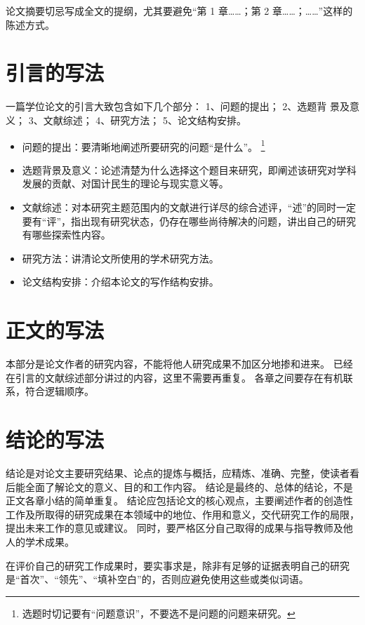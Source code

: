 论文摘要切忌写成全文的提纲，尤其要避免“第 1 章……；第 2 章……；……”这样的陈述方式。

\section{引言的写法}

一篇学位论文的引言大致包含如下几个部分：
1、问题的提出；
2、选题背 景及意义；
3、文献综述；
4、研究方法；
5、论文结构安排。
\begin{itemize}
  \item 问题的提出：要清晰地阐述所要研究的问题“是什么”。
    \footnote{选题时切记要有“问题意识”，不要选不是问题的问题来研究。}
  \item 选题背景及意义：论述清楚为什么选择这个题目来研究，即阐述该研究对学科发展的贡献、对国计民生的理论与现实意义等。
  \item 文献综述：对本研究主题范围内的文献进行详尽的综合述评，“述”的同时一定要有“评”，指出现有研究状态，仍存在哪些尚待解决的问题，讲出自己的研究有哪些探索性内容。
  \item 研究方法：讲清论文所使用的学术研究方法。
  \item 论文结构安排：介绍本论文的写作结构安排。
\end{itemize}



\section{正文的写法}

本部分是论文作者的研究内容，不能将他人研究成果不加区分地掺和进来。
已经在引言的文献综述部分讲过的内容，这里不需要再重复。
各章之间要存在有机联系，符合逻辑顺序。



\section{结论的写法}

结论是对论文主要研究结果、论点的提炼与概括，应精炼、准确、完整，使读者看后能全面了解论文的意义、目的和工作内容。
结论是最终的、总体的结论，不是正文各章小结的简单重复。
结论应包括论文的核心观点，主要阐述作者的创造性工作及所取得的研究成果在本领域中的地位、作用和意义，交代研究工作的局限，提出未来工作的意见或建议。
同时，要严格区分自己取得的成果与指导教师及他人的学术成果。

在评价自己的研究工作成果时，要实事求是，除非有足够的证据表明自己的研究是“首次”、“领先”、“填补空白”的，否则应避免使用这些或类似词语。

